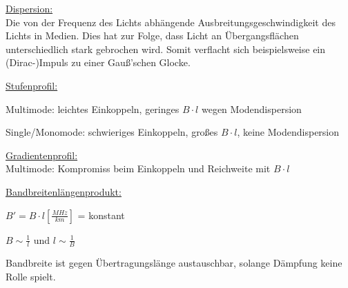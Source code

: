 \begin{description}
	\item \underline{Dispersion:}\\
	      {\small Die von der Frequenz des Lichts abhängende
		      Ausbreitungsgeschwindigkeit des Lichts in Medien. Dies hat zur Folge,
		      dass Licht an Übergangsflächen unterschiedlich stark gebrochen wird.
		      Somit verflacht sich beispielsweise ein (Dirac-)Impuls zu einer Gauß'schen
		      Glocke.
	      }

	\item \underline{Stufenprofil:}\\
	      {\small Multimode: leichtes Einkoppeln, geringes $B\cdot l$ wegen
		      Modendispersion

		      Single/Monomode: schwieriges Einkoppeln, großes $B\cdot l$, keine
		      Modendispersion
	      }

	\item \underline{Gradientenprofil:}\\
	      {\small Multimode: Kompromiss beim Einkoppeln und Reichweite mit $B\cdot l$}

	\item \underline{Bandbreitenlängenprodukt:}\\
	      {\small $B' =  B\cdot l[\frac{MHz}{km}]$ = konstant

		      $B \sim \frac{1}{l}$ und $l\sim \frac{1}{B}$

		      Bandbreite ist gegen Übertragungslänge austauschbar, solange
		      Dämpfung keine Rolle spielt.
	      }
\end{description}

